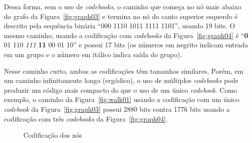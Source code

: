 \documentclass[
  article,
  11pt,
  a4paper,
  english,
  brazil,
  sumario=tradicional]{abntex2}
\begin{document}
Dessa forma, sem o uso de \textit{codebooks}, o caminho que começa no nó mais abaixo do grafo da Figura~\ref{fig:graph03} e termina no nó do canto superior esquerdo é descrito pela sequência binária \enquote{000 1110 1011 1111 1101}, usando 19 bits. O mesmo caminho, usando a codificação com \textit{codebooks} da Figura~\ref{fig:graph04} é \enquote{\textbf{0} 01 110 \textit{111} \textbf{11} 00 01 10} e possui 17 bits (os números em negrito indicam entrada em um grupo e o número em itálico indica saída do grupo).

Nesse caminho curto, ambas as codificações têm tamanhos similares, Porém, em um caminho infinitamente longo (ergódico), o uso de múltiplos \textit{codebooks} pode produzir um código mais compacto do que o uso de um único \textit{codebook}. Como exemplo, o caminho da Figura~\ref{fig:walk01} usando a codificação com um único \textit{codebook} da Figura~\ref{fig:graph03} possui 2880 bits contra 1776 bits usando a codificação com três \textit{codebooks} da Figura~\ref{fig:graph04}.

\begin{figure}[ht]
  \centering
  \caption{Codificação dos nós}
\end{figure}
\end{document}
